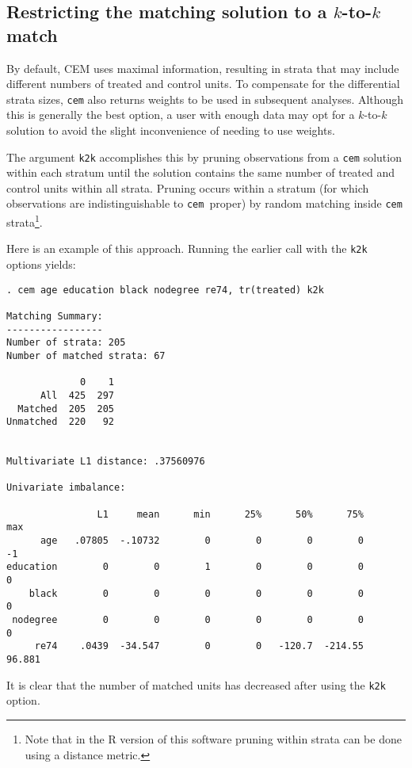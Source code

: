 \documentclass[11pt]{article}
\newcommand{\cem}{\texttt{cem }}
\begin{document}
\subsection{Restricting the matching solution to a $k$-to-$k$ match}\label{s:k2k}

By default, CEM uses maximal information, resulting in strata that may
include different numbers of treated and control units.  To compensate for
the differential strata sizes, \texttt{cem} also returns weights to be
used in subsequent analyses.  Although this is generally the best option,
a user with enough data may opt for a $k$-to-$k$ solution to avoid the
slight inconvenience of needing to use weights.

The argument \texttt{k2k} accomplishes this by pruning observations from a
\texttt{cem} solution within each stratum until the solution contains the
same number of treated and control units within all strata.  Pruning
occurs within a stratum (for which observations are indistinguishable to
\cem proper) by random matching inside \texttt{cem} strata\footnote{Note
  that in the R version of this software pruning within strata can be done
  using a distance metric.}.

Here is an example of this approach. Running the earlier call with the
\texttt{k2k} options yields:

\begin{verbatim}
. cem age education black nodegree re74, tr(treated) k2k

Matching Summary:
-----------------
Number of strata: 205
Number of matched strata: 67

             0    1
      All  425  297
  Matched  205  205
Unmatched  220   92


Multivariate L1 distance: .37560976

Univariate imbalance:

                L1     mean      min      25%      50%      75%      max
      age   .07805  -.10732        0        0        0        0       -1
education        0        0        1        0        0        0        0
    black        0        0        0        0        0        0        0
 nodegree        0        0        0        0        0        0        0
     re74    .0439  -34.547        0        0   -120.7  -214.55   96.881

\end{verbatim}

It is clear that the number of matched units has decreased after using the
\texttt{k2k} option. 
\end{document}
